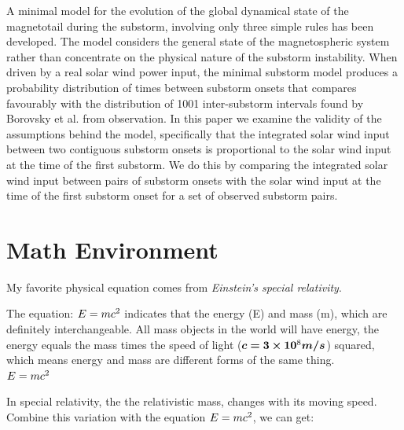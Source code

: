 \documentclass[12pt, letterpaper]{article} %
\begin{document}
A minimal model for the evolution of the global dynamical state of the magnetotail during the substorm, involving only three simple rules has been developed. The model considers the general state of the magnetospheric system rather than concentrate on the physical nature of the substorm instability. When driven by a real solar wind power input, the minimal substorm model produces a probability distribution of times between substorm onsets that compares favourably with the distribution of 1001 inter-substorm intervals found by Borovsky et al. from observation. In this paper we examine the validity of the assumptions behind the model, specifically that the integrated solar wind input between two contiguous substorm onsets is proportional to the solar wind input at the time of the first substorm. We do this by comparing the integrated solar wind input between pairs of substorm onsets with the solar wind input at the time of the first substorm onset for a set of observed substorm pairs.



\section{Math Environment} %
My favorite physical equation comes from  \textit{Einstein's special relativity}. 

The equation: $E = mc\textsuperscript{2}$ indicates that the energy (E) and mass (m), 
which are definitely interchangeable. All mass objects in the world will have energy, 
the energy equals the mass times the speed of light ($\bm{c = 3\times10\textsuperscript{8} m/s}$) 
squared, which means energy and mass are different forms of the same thing. \\ %

\begin{math}  %
  E = {mc}\textsuperscript{2} %
\end{math} %

In special relativity, the the relativistic mass, changes with its moving speed. 
Combine this variation with the equation $E = mc\textsuperscript{2}$, we can get: 
\end{document}
